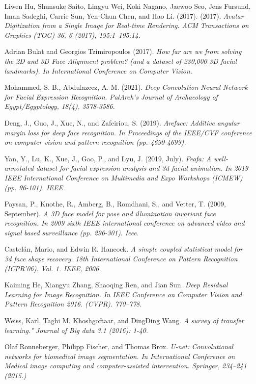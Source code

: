 \documentclass[12pt,a4]{article}
\begin{document}
\begin{thebibliography}{9}
	Liwen Hu, Shunsuke Saito, Lingyu Wei, Koki Nagano, Jaewoo Seo, Jens
	Fursund, Iman Sadeghi, Carrie Sun, Yen-Chun Chen, and Hao Li. (2017).
	(2017).
	\textit{Avatar Digitization from a Single Image for Real-time Rendering. ACM
		Transactions on Graphics (TOG) 36, 6 (2017), 195:1–195:14.}
	
	Adrian Bulat and Georgios Tzimiropoulos (2017).
	\textit{How far are we from solving the 2D and 3D Face Alignment problem? (and a dataset of 230,000 3D facial landmarks). In International Conference on Computer Vision.}
	
	Mohammed, S. B., Abdulazeez, A. M. (2021).
	\textit{Deep Convolution Neural
		Network for Facial Expression Recognition. PalArch’s Journal of Archaeology of Egypt/Egyptology, 18(4), 3578-3586.}
	
	Deng, J., Guo, J., Xue, N., and Zafeiriou, S. (2019).
	\textit{Arcface: Additive angular margin loss for deep face recognition. In Proceedings of the
		IEEE/CVF conference on computer vision and pattern recognition (pp.
		4690-4699).}
	
	Yan, Y., Lu, K., Xue, J., Gao, P., and Lyu, J. (2019, July).
	\textit{Feafa: A
		well-annotated dataset for facial expression analysis and 3d facial animation. In 2019 IEEE International Conference on Multimedia and Expo
		Workshops (ICMEW) (pp. 96-101). IEEE.}
	
	Paysan, P., Knothe, R., Amberg, B., Romdhani, S., and Vetter, T. (2009, September).
	\textit{A 3D face model for pose and illumination invariant
		face recognition. In 2009 sixth IEEE international conference on advanced
		video and signal based surveillance (pp. 296-301). Ieee.}

	Castelán, Mario, and Edwin R. Hancock.
	\textit{A simple coupled statistical model for 3d face shape recovery. 18th International Conference on Pattern Recognition (ICPR'06). Vol. 1. IEEE, 2006.}


	Kaiming He, Xiangyu Zhang, Shaoqing Ren, and Jian Sun.
	\textit{Deep Residual Learning for Image Recognition. In IEEE Conference on Computer Vision and Pattern Recognition  2016. (CVPR). 770–778.}

    Weiss, Karl, Taghi M. Khoshgoftaar, and DingDing Wang.
    \textit{A survey of transfer learning." Journal of Big data 3.1 (2016): 1-40.}

    Olaf Ronneberger, Philipp Fischer, and Thomas Brox.
    \textit{U-net: Convolutional networks for biomedical image segmentation. In International Conference on Medical image computing and computer-assisted intervention. Springer, 234–241 (2015.)}


\end{thebibliography}
\end{document}
